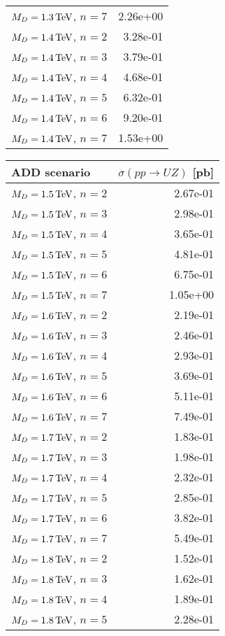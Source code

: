 \begin{table}[hbtp]
\begin{center}
{\begin{tabular}{lr}
$M_{D} = 1.3 \,\text{Te\hspace{-.08em}V}$, $n=7$  & 2.26e+00 \\
$M_{D} = 1.4 \,\text{Te\hspace{-.08em}V}$, $n=2$  & 3.28e-01 \\
$M_{D} = 1.4 \,\text{Te\hspace{-.08em}V}$, $n=3$  & 3.79e-01 \\
$M_{D} = 1.4 \,\text{Te\hspace{-.08em}V}$, $n=4$  & 4.68e-01 \\
$M_{D} = 1.4 \,\text{Te\hspace{-.08em}V}$, $n=5$  & 6.32e-01 \\
$M_{D} = 1.4 \,\text{Te\hspace{-.08em}V}$, $n=6$  & 9.20e-01 \\
$M_{D} = 1.4 \,\text{Te\hspace{-.08em}V}$, $n=7$  & 1.53e+00 \\\hline
  \end{tabular}
  \quad \quad
  \begin{tabular}{lr}
\hline 
ADD scenario              & $\sigma(pp\rightarrow UZ)$ [pb]\\
\hline
$M_{D} = 1.5 \,\text{Te\hspace{-.08em}V}$, $n=2$  & 2.67e-01 \\
$M_{D} = 1.5 \,\text{Te\hspace{-.08em}V}$, $n=3$  & 2.98e-01 \\
$M_{D} = 1.5 \,\text{Te\hspace{-.08em}V}$, $n=4$  & 3.65e-01 \\
$M_{D} = 1.5 \,\text{Te\hspace{-.08em}V}$, $n=5$  & 4.81e-01 \\
$M_{D} = 1.5 \,\text{Te\hspace{-.08em}V}$, $n=6$  & 6.75e-01 \\
$M_{D} = 1.5 \,\text{Te\hspace{-.08em}V}$, $n=7$  & 1.05e+00 \\
$M_{D} = 1.6 \,\text{Te\hspace{-.08em}V}$, $n=2$  & 2.19e-01 \\
$M_{D} = 1.6 \,\text{Te\hspace{-.08em}V}$, $n=3$  & 2.46e-01 \\
$M_{D} = 1.6 \,\text{Te\hspace{-.08em}V}$, $n=4$  & 2.93e-01 \\
$M_{D} = 1.6 \,\text{Te\hspace{-.08em}V}$, $n=5$  & 3.69e-01 \\
$M_{D} = 1.6 \,\text{Te\hspace{-.08em}V}$, $n=6$  & 5.11e-01 \\
$M_{D} = 1.6 \,\text{Te\hspace{-.08em}V}$, $n=7$  & 7.49e-01 \\
$M_{D} = 1.7 \,\text{Te\hspace{-.08em}V}$, $n=2$  & 1.83e-01 \\
$M_{D} = 1.7 \,\text{Te\hspace{-.08em}V}$, $n=3$  & 1.98e-01 \\
$M_{D} = 1.7 \,\text{Te\hspace{-.08em}V}$, $n=4$  & 2.32e-01 \\
$M_{D} = 1.7 \,\text{Te\hspace{-.08em}V}$, $n=5$  & 2.85e-01 \\
$M_{D} = 1.7 \,\text{Te\hspace{-.08em}V}$, $n=6$  & 3.82e-01 \\
$M_{D} = 1.7 \,\text{Te\hspace{-.08em}V}$, $n=7$  & 5.49e-01 \\
$M_{D} = 1.8 \,\text{Te\hspace{-.08em}V}$, $n=2$  & 1.52e-01 \\
$M_{D} = 1.8 \,\text{Te\hspace{-.08em}V}$, $n=3$  & 1.62e-01 \\
$M_{D} = 1.8 \,\text{Te\hspace{-.08em}V}$, $n=4$  & 1.89e-01 \\
$M_{D} = 1.8 \,\text{Te\hspace{-.08em}V}$, $n=5$  & 2.28e-01 \\

\end{tabular}}
\end{center}
\end{table}
